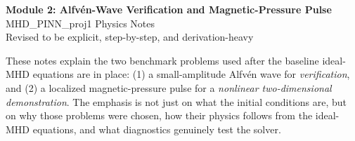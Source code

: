 \documentclass[11pt]{article}
\begin{document}
\begin{center}
    {\LARGE\bfseries Module 2: Alfv\'en-Wave Verification and Magnetic-Pressure Pulse}\\[0.6em]
    {\large MHD\_PINN\_proj1 Physics Notes}\\[0.4em]
    {\normalsize Revised to be explicit, step-by-step, and derivation-heavy}
\end{center}

\vspace{0.8em}

\begin{overviewbox}
These notes explain the two benchmark problems used after the baseline ideal-MHD equations are in place:
(1) a small-amplitude Alfv\'en wave for \emph{verification}, and
(2) a localized magnetic-pressure pulse for a \emph{nonlinear two-dimensional demonstration}.
The emphasis is not just on what the initial conditions are, but on why those problems were chosen, how their physics follows from the ideal-MHD equations, and what diagnostics genuinely test the solver.
\end{overviewbox}
\end{document}
